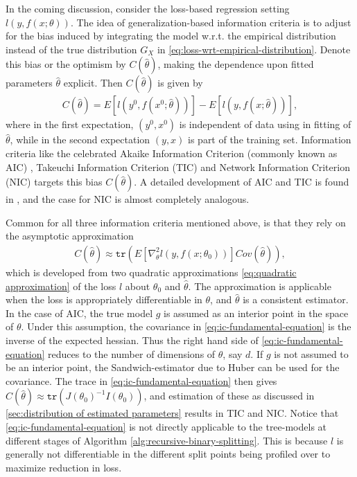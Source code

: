 
In the coming discussion, consider the loss-based regression setting $l(y,f(x;\theta))$.
The idea of generalization-based information criteria is to adjust for the bias induced by integrating the model w.r.t. the empirical distribution instead of the true distribution $G_X$ in \eqref{eq:loss-wrt-empirical-distribution}.
Denote this bias or the optimism by $C(\hat{\theta})$, making the dependence upon fitted parameters $\hat\theta$ explicit.
Then $C(\hat\theta)$ is given by
\begin{align}\label{eq:information criterion bias}
	C(\hat\theta) = E\left[ l(y^0,f(x^0;\hat{\theta}))\right] - E\left[ l(y,f(x;\hat{\theta}))\right],
\end{align}
where in the first expectation, $(y^0,x^0)$ is independent of data using in fitting of $\hat\theta$, while in the second expectation $(y,x)$ is part of the training set.
Information criteria like the celebrated Akaike Information Criterion (commonly known as AIC) \citep{akaike1974new}, Takeuchi Information Criterion (TIC) \citep{takeuchi1976distribution} and Network Information Criterion (NIC) \citep{murata1994network} targets this bias $C(\hat\theta)$.
A detailed development of AIC and TIC is found in \citet{burnham2003model}, and the case for NIC is almost completely analogous.

Common for all three information criteria mentioned above, is that they rely on the asymptotic approximation
\begin{align}\label{eq:ic-fundamental-equation}
	C(\hat\theta) \approx \texttt{tr}\left( E\left[ \nabla_\theta^2l(y,f(x;\theta_0))\right]Cov(\hat\theta)\right),
\end{align}
which is developed from two quadratic approximations \ref{eq:quadratic approximation} of the loss $l$ about $\theta_0$ and $\hat\theta$.
The approximation is applicable when the loss is appropriately differentiable in $\theta$, and $\hat\theta$ is a consistent estimator.
In the case of AIC, the true model $g$ is assumed as an interior point in the space of $\theta$.
Under this assumption, the covariance in \eqref{eq:ic-fundamental-equation} is the inverse of the expected hessian. Thus the right hand side of \eqref{eq:ic-fundamental-equation} reduces to the number of dimensions of $\theta$, say $d$.
If $g$ is not assumed to be an interior point, the Sandwich-estimator due to Huber \citep{huber1967behavior} can be used for the covariance.
The trace in \eqref{eq:ic-fundamental-equation} then gives $C(\hat\theta)\approx\texttt{tr}(J(\theta_0)^{-1}I(\theta_0))$, and estimation of these as discussed in \ref{sec:distribution of estimated parameters} results in TIC and NIC.
Notice that \eqref{eq:ic-fundamental-equation} is not directly applicable to the tree-models at different stages of Algorithm \ref{alg:recursive-binary-splitting}.
This is because $l$ is generally not differentiable in the different split points being profiled over to maximize reduction in loss.

